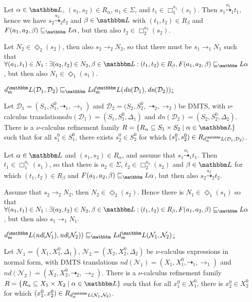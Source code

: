 \documentclass[twocolumn]{svjour3-dummy}
\newcommand*{\must}[1]{\overset{#1}{\longrightarrow}}
\newcommand*{\omust}{\mathord{\must{}}}
\newcommand*\cD{\mathcal D}
\newcommand*{\may}[1]{\overset{#1}{\dashrightarrow}}
\newcommand*{\omay}{\mathord{\may{}}}
\newcommand*\cN{\mathcal N}
\newcommand*\ddh{\textit{dn}} \newcommand*\hd{\textit{nd}} \newcommand*\viz{\textit{viz.}\xspace}
\newcommand*\LL{\mathbbm L}
\begin{document}
  Let $\alpha\in \LL$, $( s_1, s_2)\in R_\alpha$, $a_1\in \Sigma$, and
  $t_1\in \Box^{ a_1}_1( s_1)$.  Then $s_1\may{ a_1}_1 t_1$, hence we
  have $s_2\may{ a_2}_2 t_2$ and $\beta\in \LL$ with $( t_1, t_2)\in
  R_\beta$ and $F( a_1, a_2, \beta)\sqsubseteq_\LL \alpha$, but then
  also $t_2\in \Box^{ a_2}_2( s_2)$.

  Let $N_2\in \Diamond_2( s_2)$, then also $s_2\must{}_2 N_2$, so that
  there must be $s_1\must{}_1 N_1$ such that $\forall( a_1, t_1)\in N_1:
  \exists( a_2, t_2)\in N_2, \beta\in \LL:( t_1, t_2)\in R_\beta, F(
  a_1, a_2, \beta)\sqsubseteq_\LL \alpha$, but then also $N_1\in
  \Diamond_1( s_1)$.

  \medskip \noindent \underline{$\mdl( \cD_1, \cD_2)\sqsubseteq_\LL
    \mdl( \ddh( \cD_1), \ddh( \cD_2))$:}

  Let $\cD_1=( S_1, S_1^0, \omay_1, \omust_1)$ and $\cD_2=( S_2, S_2^0,$
  $\omay_2, \omust_2)$ be DMTS, with $\nu$-calculus
  translations\linebreak[4]$\ddh( \cD_1)=( S_1, S_1^0, \Delta_1)$ and $\ddh( \cD_2)=( S_2, S_2^0,
  \Delta_2)$.  There is a $\nu$-calculus refinement family $R=\{
  R_\alpha\subseteq S_1\times S_2\mid \alpha\in \LL\}$ such that for all
  $s_1^0\in S_1^0$, there exists $s_2^0\in S_2^0$ for which $( s_1^0,
  s_2^0)\in R_{ \mdl( \cD_1, \cD_2)}$.

  Let $\alpha\in \LL$ and $( s_1, s_2)\in R_\alpha$, and assume that
  $s_1\may{ a_1}_1 t_1$.  Then $t_1\in \Box^{ a_1}_1( s_1)$, so that
  there is $a_2\in \Sigma$, $t_2\in \Box^{ a_2}_2( s_2)$ and $\beta\in
  \LL$ for which $( t_1, t_2)\in R_\beta$ and $F( a_1, a_2,
  \beta)\sqsubseteq_\LL \alpha$, but then also $s_2\may{ a_2}_2 t_2$.

  Assume that $s_2\must{}_2 N_2$, then $N_2\in \Diamond_2( s_2)$.  Hence
  there is $N_1\in \Diamond_1( s_1)$ so that $\forall( a_1, t_1)\in N_1:
  \exists( a_2, t_2)\in N_2, \beta\in \LL:( t_1, t_2)\in R_\beta, F(
  a_1, a_2, \beta)\sqsubseteq_\LL \alpha$, but then also $s_1\must{}_1
  N_1$.

  \medskip \noindent \underline{$\mdl( \hd( \cN_1), \hd(
    \cN_2))\sqsubseteq_\LL \mdl( \cN_1, \cN_2)$:}

  Let $\cN_1=( X_1, X_1^0, \Delta_1)$, $\cN_2=( X_2, X_2^0, \Delta_2)$
  be $\nu$-calculus expressions in normal form, with DMTS translations
  $\hd( \cN_1)=( X_1, X_1^0, \omay_1, \omust_1)$ and $\hd( \cN_2)=( X_2,
  X_2^0, \omay_2, \omust_2)$.  There is a $\nu$-calculus refinement
  family $R=\{ R_\alpha\subseteq X_1\times X_2\mid \alpha\in \LL\}$ such
  that for all $x_1^0\in X_1^0$, there is $x_2^0\in X_2^0$ for which $(
  x_1^0, x_2^0)\in R_{ \mdl( \cN_1, \cN_2)}$.
\end{document}
